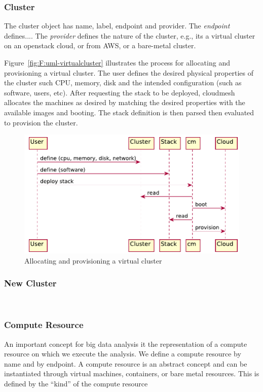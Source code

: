 \documentclass[10pt]{article}
\begin{document}
\subsubsection{Cluster}

The cluster object has name, label, endpoint and provider. The
\textit{endpoint} defines....  The \textit{provider} defines the
nature of the cluster, e.g., its a virtual cluster on an openstack
cloud, or from AWS, or a bare-metal cluster.

Figure~\ref{fig:F:uml-virtualcluster} illustrates the process for
allocating and provisioning a virtual cluster.  The user defines the
desired physical properties of the cluster such CPU, memory, disk and
the intended configuration (such as software, users, etc).  After
requesting the stack to be deployed, cloudmesh allocates the machines
as desired by matching the desired properties with the available
images and booting. The stack definition is then parsed then evaluated
to provision the cluster.

\begin{figure}[!h]
\centering
\includegraphics[width=0.5\columnwidth]{images/uml/virtualcluster.pdf}
\caption{Allocating and provisioning a virtual cluster}\label{F:uml-virtualcluster}
\end{figure}




\subsubsection{New Cluster}

\
\subsubsection{Compute Resource}

An important concept for big data analysis it the representation of a
compute resource on which we execute the analysis. We define a compute
resource by name and by endpoint. A compute resource is an abstract
concept and can be instantiated through virtual machines, containers,
or bare metal resources. This is defined by the “kind” of the compute
resource 
\end{document}
